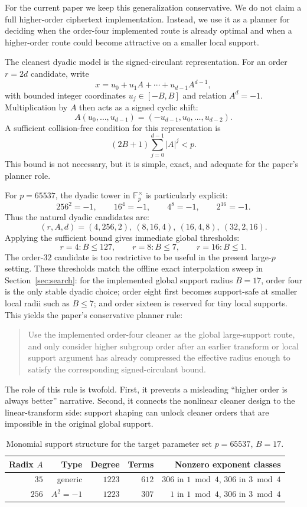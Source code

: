 \documentclass[a4paper,runningheads]{llncs}
\newcommand{\Fp}{\mathbb{F}_p}
\begin{document}
For the current paper we keep this generalization conservative.  We do not
claim a full higher-order ciphertext implementation.  Instead, we use it as a
planner for deciding when the order-four implemented route is already optimal
and when a higher-order route could become attractive on a smaller local
support.

The cleanest dyadic model is the signed-circulant representation.  For an order
$r=2d$ candidate, write
\[
  x = u_0 + u_1A + \cdots + u_{d-1}A^{d-1},
\]
with bounded integer coordinates $u_j\in[-B,B]$ and relation $A^d=-1$.
Multiplication by $A$ then acts as a signed cyclic shift:
\[
  A(u_0,\ldots,u_{d-1}) = (-u_{d-1},u_0,\ldots,u_{d-2}).
\]
A sufficient collision-free condition for this representation is
\[
  (2B+1)\sum_{j=0}^{d-1}|A|^j < p.
\]
This bound is not necessary, but it is simple, exact, and adequate for the
paper's planner role.

For $p=65537$, the dyadic tower in $\Fp^\times$ is particularly explicit:
\[
  256^2=-1,\qquad 16^4=-1,\qquad 4^8=-1,\qquad 2^{16}=-1.
\]
Thus the natural dyadic candidates are:
\[
  (r,A,d)=(4,256,2),\ (8,16,4),\ (16,4,8),\ (32,2,16).
\]
Applying the sufficient bound gives immediate global thresholds:
\[
  r=4: B\le 127,
  \qquad
  r=8: B\le 7,
  \qquad
  r=16: B\le 1.
\]
The order-$32$ candidate is too restrictive to be useful in the present large-$p$
setting.  These thresholds match the offline exact interpolation sweep in
Section~\ref{sec:search}: for the implemented global support radius $B=17$,
order four is the only stable dyadic choice; order eight first becomes
support-safe at smaller local radii such as $B\le 7$; and order sixteen is
reserved for tiny local supports.
This yields the paper's conservative planner rule:
\begin{quote}
Use the implemented order-four cleaner as the global large-support route, and
only consider higher subgroup order after an earlier transform or local support
argument has already compressed the effective radius enough to satisfy the
corresponding signed-circulant bound.
\end{quote}

The role of this rule is twofold.  First, it prevents a misleading “higher order
is always better” narrative.  Second, it connects the nonlinear cleaner design
to the linear-transform side: support shaping can unlock cleaner orders that are
impossible in the original global support.

\begin{table}[t]
\centering
\caption{Monomial support structure for the target parameter set
$p=65537$, $B=17$.}
\label{tab:term_structure}
\begin{tabular}{rrrrr}
\toprule
\textbf{Radix $A$} & \textbf{Type} & \textbf{Degree} &
\textbf{Terms} & \textbf{Nonzero exponent classes} \\
\midrule
$35$ & generic & $1223$ & $612$ &
$306$ in $1\bmod4$, $306$ in $3\bmod4$ \\
$256$ & $A^2=-1$ & $1223$ & $307$ &
$1$ in $1\bmod4$, $306$ in $3\bmod4$ \\
\bottomrule
\end{tabular}
\end{table}
\end{document}
